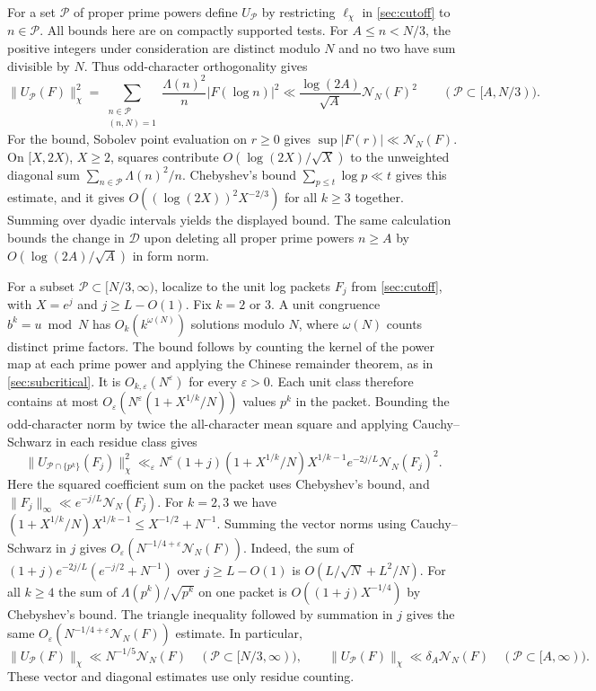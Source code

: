\documentclass[11pt,a4paper]{article}
\numberwithin{equation}{section}
\newcommand{\NN}{\mathcal N_N}
\begin{document}
For a set $\mathcal P$ of proper prime powers define
$U_{\mathcal P}$ by restricting $\ell_\chi$ in \cref{sec:cutoff}
to $n\in\mathcal P$. All bounds here are on compactly supported
tests. For $A\le n<N/3$, the positive integers under consideration
are distinct modulo $N$ and no two have sum divisible by $N$.
Thus odd-character orthogonality gives
\[
 \|U_{\mathcal P}(F)\|_\chi^2
     =\sum_{\substack{n\in\mathcal P\\(n,N)=1}}
       \frac{\Lambda(n)^2}{n}|F(\log n)|^2
     \ll \frac{\log(2A)}{\sqrt A}\NN(F)^2
     \qquad(\mathcal P\subset [A,N/3)).
\]
For the bound, Sobolev point evaluation on $r\ge0$ gives
$\sup |F(r)|\ll\NN(F)$. On $[X,2X)$, $X\ge2$, squares
contribute $O(\log(2X)/\sqrt X)$ to the unweighted diagonal
sum $\sum_{n\in\mathcal P}\Lambda(n)^2/n$. Chebyshev's bound
$\sum_{p\le t}\log p\ll t$ gives this estimate, and it gives
$O((\log(2X))^2 X^{-2/3})$ for all $k\ge3$ together.
Summing over dyadic intervals yields the displayed bound.
The same calculation bounds the change in $\mathcal D$
upon deleting all proper prime powers $n\ge A$ by
$O(\log(2A)/\sqrt A)$ in form norm.

For a subset $\mathcal P\subset[N/3,\infty)$, localize to the
unit log packets $F_j$ from \cref{sec:cutoff}, with $X=e^j$
and $j\ge L-O(1)$. Fix $k=2$ or $3$. A unit congruence
$b^k=u\bmod N$ has $O_k(k^{\omega(N)})$ solutions modulo $N$,
where $\omega(N)$ counts distinct prime factors.
The bound follows by counting the kernel of the power map at
each prime power and applying the Chinese remainder theorem,
as in \cref{sec:subcritical}. It is $O_{k,\varepsilon}(N^\varepsilon)$
for every $\varepsilon>0$. Each unit class therefore contains at
most $O_\varepsilon(N^\varepsilon(1+X^{1/k}/N))$ values $p^k$
in the packet. Bounding the odd-character norm by twice the
all-character mean square and applying Cauchy--Schwarz in
each residue class gives
\[
 \|U_{\mathcal P\cap\{p^k\}}(F_j)\|_\chi^2
    \ll_\varepsilon N^\varepsilon (1+j)
        (1+X^{1/k}/N)X^{1/k-1}e^{-2j/L}\NN(F_j)^2 .
\]
Here the squared coefficient sum on the packet uses Chebyshev's
bound, and $\|F_j\|_\infty\ll e^{-j/L}\NN(F_j)$.
For $k=2,3$ we have
$(1+X^{1/k}/N)X^{1/k-1}\le X^{-1/2}+N^{-1}$.
Summing the vector norms using
Cauchy--Schwarz in $j$ gives $O_\varepsilon(N^{-1/4+\varepsilon}
\NN(F))$. Indeed, the sum of
$(1+j)e^{-2j/L}(e^{-j/2}+N^{-1})$ over $j\ge L-O(1)$ is
$O(L/\sqrt N+L^2/N)$.
For all $k\ge4$ the sum of $\Lambda(p^k)/\sqrt{p^k}$ on
one packet is $O((1+j)X^{-1/4})$ by Chebyshev's bound.
The triangle inequality followed by summation in $j$ gives the
same $O_\varepsilon(N^{-1/4+\varepsilon}\NN(F))$ estimate.
In particular,
\begin{equation}
 \|U_{\mathcal P}(F)\|_\chi \ll N^{-1/5}\NN(F)
     \quad(\mathcal P\subset[N/3,\infty)),\qquad
 \|U_{\mathcal P}(F)\|_\chi \ll \delta_A\NN(F)
     \quad(\mathcal P\subset[A,\infty)).
 \label{eq:ppchar}
\end{equation}
These vector and diagonal estimates use only residue counting.
\end{document}
